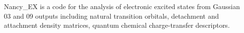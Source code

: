 Nancy_EX is a code for the analysis of electronic excited states from Gaussian 03 and 09 outputs including natural transition orbitals, detachment and attachment density matrices, quantum chemical charge-transfer descriptors.